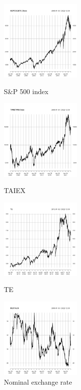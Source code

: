 \documentclass[]{AEA}
\begin{document}
\begin{spacing}{2.0}
\mbox{}
\newpage
\begin{figure}[htbp]
  \centering
  \begin{minipage}{0.4\textwidth}
    \centering
    \includegraphics[width=\linewidth,height=4cm]{Figure/GSPC.png}
    \caption{S\&P 500 index}
    \label{f1}
  \end{minipage}
  \hfill
  \begin{minipage}{0.4\textwidth}
    \centering
    \includegraphics[width=\linewidth,height=4cm]{Figure/TWII.png}
    \caption{TAIEX}
    \label{f2}
  \end{minipage}
  \begin{minipage}{0.4\textwidth}
  \centering
    \includegraphics[width=\linewidth,height=4cm]{Figure/TE.png}
    \caption{TE}
    \label{f3}
  \end{minipage}
  \hfill
  \begin{minipage}{0.4\textwidth}
  \centering
    \includegraphics[width=\linewidth,height=4cm]{Figure/DEXTAUS.png}
    \caption{Nominal exchange rate}
    \label{f4}
  \end{minipage}  
\end{figure}




\end{spacing}
\end{document}
